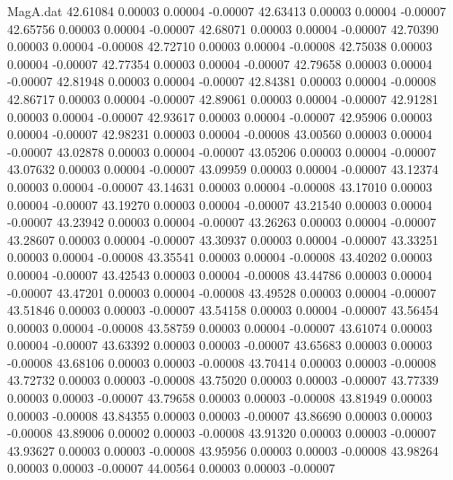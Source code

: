 \begin{filecontents}{MagA.dat}
  42.61084    0.00003    0.00004   -0.00007
  42.63413    0.00003    0.00004   -0.00007
  42.65756    0.00003    0.00004   -0.00007
  42.68071    0.00003    0.00004   -0.00007
  42.70390    0.00003    0.00004   -0.00008
  42.72710    0.00003    0.00004   -0.00008
  42.75038    0.00003    0.00004   -0.00007
  42.77354    0.00003    0.00004   -0.00007
  42.79658    0.00003    0.00004   -0.00007
  42.81948    0.00003    0.00004   -0.00007
  42.84381    0.00003    0.00004   -0.00008
  42.86717    0.00003    0.00004   -0.00007
  42.89061    0.00003    0.00004   -0.00007
  42.91281    0.00003    0.00004   -0.00007
  42.93617    0.00003    0.00004   -0.00007
  42.95906    0.00003    0.00004   -0.00007
  42.98231    0.00003    0.00004   -0.00008
  43.00560    0.00003    0.00004   -0.00007
  43.02878    0.00003    0.00004   -0.00007
  43.05206    0.00003    0.00004   -0.00007
  43.07632    0.00003    0.00004   -0.00007
  43.09959    0.00003    0.00004   -0.00007
  43.12374    0.00003    0.00004   -0.00007
  43.14631    0.00003    0.00004   -0.00008
  43.17010    0.00003    0.00004   -0.00007
  43.19270    0.00003    0.00004   -0.00007
  43.21540    0.00003    0.00004   -0.00007
  43.23942    0.00003    0.00004   -0.00007
  43.26263    0.00003    0.00004   -0.00007
  43.28607    0.00003    0.00004   -0.00007
  43.30937    0.00003    0.00004   -0.00007
  43.33251    0.00003    0.00004   -0.00008
  43.35541    0.00003    0.00004   -0.00008
  43.40202    0.00003    0.00004   -0.00007
  43.42543    0.00003    0.00004   -0.00008
  43.44786    0.00003    0.00004   -0.00007
  43.47201    0.00003    0.00004   -0.00008
  43.49528    0.00003    0.00004   -0.00007
  43.51846    0.00003    0.00003   -0.00007
  43.54158    0.00003    0.00004   -0.00007
  43.56454    0.00003    0.00004   -0.00008
  43.58759    0.00003    0.00004   -0.00007
  43.61074    0.00003    0.00004   -0.00007
  43.63392    0.00003    0.00003   -0.00007
  43.65683    0.00003    0.00003   -0.00008
  43.68106    0.00003    0.00003   -0.00008
  43.70414    0.00003    0.00003   -0.00008
  43.72732    0.00003    0.00003   -0.00008
  43.75020    0.00003    0.00003   -0.00007
  43.77339    0.00003    0.00003   -0.00007
  43.79658    0.00003    0.00003   -0.00008
  43.81949    0.00003    0.00003   -0.00008
  43.84355    0.00003    0.00003   -0.00007
  43.86690    0.00003    0.00003   -0.00008
  43.89006    0.00002    0.00003   -0.00008
  43.91320    0.00003    0.00003   -0.00007
  43.93627    0.00003    0.00003   -0.00008
  43.95956    0.00003    0.00003   -0.00008
  43.98264    0.00003    0.00003   -0.00007
  44.00564    0.00003    0.00003   -0.00007

\end{filecontents}
